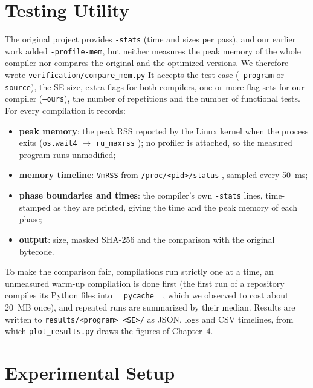 \documentclass[12pt,a4paper,oneside]{report}
\newcommand{\code}[1]{\texttt{#1}}
\begin{document}
\section{Testing Utility}
\label{sec:utility}
The original project provides \code{-stats} (time and sizes per pass), and our earlier work added
\code{-profile-mem}, but neither measures the peak memory of the whole compiler nor compares the
original and the optimized versions. We therefore wrote \code{verification/compare\_mem.py}
It accepts the test case (\code{--program} or \code{--source}), the SE
size, extra flags for both compilers, one or more flag sets for our compiler (\code{--ours}), the
number of repetitions and the number of functional tests. For every compilation it records:
\begin{itemize}
\item \textbf{peak memory}: the peak RSS reported by the Linux kernel when the process exits
      (\code{os.wait4} $\rightarrow$ \code{ru\_maxrss} \cite{getrusage}); no profiler is attached,
      so the measured program runs unmodified;
\item \textbf{memory timeline}: \code{VmRSS} from \code{/proc/<pid>/status} \cite{procfs}, sampled
      every 50~ms;
\item \textbf{phase boundaries and times}: the compiler's own \code{-stats} lines, time-stamped as
      they are printed, giving the time and the peak memory of each phase;
\item \textbf{output}: size, masked SHA-256 and the comparison with the original bytecode.
\end{itemize}
To make the comparison fair, compilations run strictly one at a time, an unmeasured warm-up
compilation is done first (the first run of a repository compiles its Python files into
\code{\_\_pycache\_\_}, which we observed to cost about 20~MB once), and repeated runs are
summarized by their median. Results are written to \code{results/<program>\_<SE>/} as JSON, logs
and CSV timelines, from which \code{plot\_results.py} draws the figures of Chapter~4.

\section{Experimental Setup}
\end{document}
